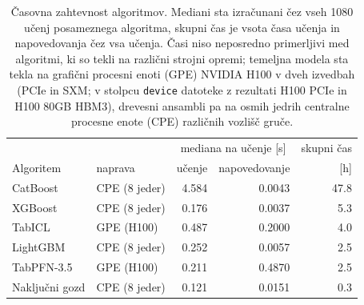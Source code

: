 \begin{table}[H]
\centering
\caption{Časovna zahtevnost algoritmov. Mediani sta izračunani čez vseh 1080 učenj posameznega algoritma, skupni čas je vsota časa učenja in napovedovanja čez vsa učenja. Časi niso neposredno primerljivi med algoritmi, ki so tekli na različni strojni opremi; temeljna modela sta tekla na grafični procesni enoti (GPE) NVIDIA H100 v dveh izvedbah (PCIe in SXM; v stolpcu \texttt{device} datoteke z rezultati H100 PCIe in H100 80GB HBM3), drevesni ansambli pa na osmih jedrih centralne procesne enote (CPE) različnih vozlišč gruče.}
\label{tab:casi}
\footnotesize
\begin{tabular}{llrrr}
\hline
 & & \multicolumn{2}{c}{mediana na učenje [s]} & skupni čas \\
Algoritem & naprava & učenje & napovedovanje & [h] \\
\hline
CatBoost & CPE (8 jeder) & \num{4.584} & \num{0.0043} & \num{47.8} \\
XGBoost & CPE (8 jeder) & \num{0.176} & \num{0.0037} & \num{5.3} \\
TabICL & GPE (H100) & \num{0.487} & \num{0.2000} & \num{4.0} \\
LightGBM & CPE (8 jeder) & \num{0.252} & \num{0.0057} & \num{2.5} \\
TabPFN-3.5 & GPE (H100) & \num{0.211} & \num{0.4870} & \num{2.5} \\
Naključni gozd & CPE (8 jeder) & \num{0.121} & \num{0.0151} & \num{0.3} \\
\hline
\end{tabular}
\end{table}
